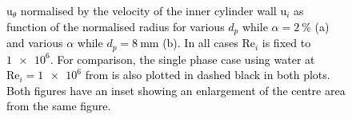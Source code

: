 \documentclass{jfm}
\newcommand\rey{\text{Re}}
\newcommand{\red}[1]{\textcolor{black}{#1}}
\begin{document}
\begin{figure}
\centering%
%
%
\caption{%
\red{
$\text{u}_\theta$ normalised by the velocity of the inner cylinder wall
$\text{u}_i$ as function of the normalised radius for various $d_p$ while
$\alpha=\SI{2}{\percent}$ (a) and various $\alpha$ while
$d_p=\SI{8}{\milli\metre}$ (b). In all cases $\rey_i$ is fixed to $\num{1e6}$.
For comparison, the single phase case using water at $\rey_i=\num{1e6}$ from
\cite{Huisman2013} is also plotted in dashed black in both plots. Both figures
have an inset showing an enlargement of the centre area from the same
figure.}} \label{fig:ldaradial}
\end{figure}
\end{document}
